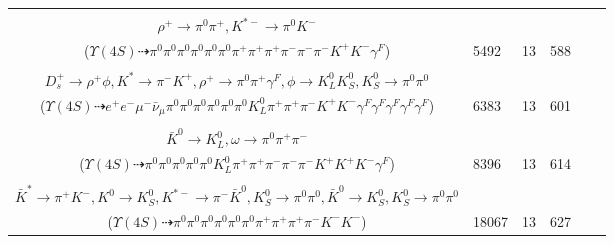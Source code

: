 \documentclass[landscape]{article}
\newcounter{rownumbers}
\newcommand\rn{\stepcounter{rownumbers}\arabic{rownumbers}}
\newcommand{\EOLP}{\\ \hline} %
\newcommand{\topoTags}[1]{#1} %
\begin{document}
\begin{longtable}{clcccc}
\rn & \makecell[l]{ $ 
\Upsilon(4S) \rightarrow B^{0} \bar{B}^{0} ,
B^{0} \rightarrow \pi^{0} \pi^{+} \rho^{-} \omega \bar{D}^{0} ,
\bar{B}^{0} \rightarrow \rho^{+} K^{*-} ,
\rho^{-} \rightarrow \pi^{0} \pi^{-} ,
\omega \rightarrow \pi^{0} \pi^{+} \pi^{-} ,
\bar{D}^{0} \rightarrow \pi^{0} \pi^{-} K^{+} \gamma^{F} ,
$ \\ $
\rho^{+} \rightarrow \pi^{0} \pi^{+} ,
K^{*-} \rightarrow \pi^{0} K^{-} 
$ \\ ($
\Upsilon(4S) \dashrightarrow \pi^{0} \pi^{0} \pi^{0} \pi^{0} \pi^{0} \pi^{0} \pi^{+} \pi^{+} \pi^{+} \pi^{-} \pi^{-} \pi^{-} K^{+} K^{-} \gamma^{F} 
$) } & \topoTags{5492 & }13 & 588 \EOLP

\rn & \makecell[l]{ $ 
\Upsilon(4S) \rightarrow B^{0} \bar{B}^{0} ,
B^{0} \rightarrow \eta \eta D^{-} D_{s}^{+} ,
\bar{B}^{0} \rightarrow \pi^{+} K^{-} \gamma^{F} \gamma^{F} ,
\eta \rightarrow \pi^{0} \pi^{0} \pi^{0} ,
\eta \rightarrow e^{+} e^{-} \gamma^{F} \gamma^{F} ,
D^{-} \rightarrow \mu^{-} \bar{\nu}_{\mu} K^{*} ,
$ \\ $
D_{s}^{+} \rightarrow \rho^{+} \phi ,
K^{*} \rightarrow \pi^{-} K^{+} ,
\rho^{+} \rightarrow \pi^{0} \pi^{+} \gamma^{F} ,
\phi \rightarrow K_{L}^{0} K_{S}^{0} ,
K_{S}^{0} \rightarrow \pi^{0} \pi^{0} 
$ \\ ($
\Upsilon(4S) \dashrightarrow e^{+} e^{-} \mu^{-} \bar{\nu}_{\mu} \pi^{0} \pi^{0} \pi^{0} \pi^{0} \pi^{0} \pi^{0} K_{L}^{0} \pi^{+} \pi^{+} \pi^{-} K^{+} K^{-} \gamma^{F} \gamma^{F} \gamma^{F} \gamma^{F} \gamma^{F} 
$) } & \topoTags{6383 & }13 & 601 \EOLP

\rn & \makecell[l]{ $ 
\Upsilon(4S) \rightarrow B^{0} \bar{B}^{0} ,
B^{0} \rightarrow \pi^{+} \rho^{-} \eta K^{+} D_{s}^{-} ,
\bar{B}^{0} \rightarrow \bar{K}^{0} K^{+} K^{-} \gamma^{F} ,
\rho^{-} \rightarrow \pi^{0} \pi^{-} ,
\eta \rightarrow \pi^{0} \pi^{0} \pi^{0} ,
D_{s}^{-} \rightarrow \pi^{-} \omega ,
$ \\ $
\bar{K}^{0} \rightarrow K_{L}^{0} ,
\omega \rightarrow \pi^{0} \pi^{+} \pi^{-} 
$ \\ ($
\Upsilon(4S) \dashrightarrow \pi^{0} \pi^{0} \pi^{0} \pi^{0} \pi^{0} K_{L}^{0} \pi^{+} \pi^{+} \pi^{-} \pi^{-} \pi^{-} K^{+} K^{+} K^{-} \gamma^{F} 
$) } & \topoTags{8396 & }13 & 614 \EOLP

\rn & \makecell[l]{ $ 
\Upsilon(4S) \rightarrow \bar{B}^{0} \bar{B}^{0} ,
\bar{B}^{0} \rightarrow \pi^{+} K^{*}(1410)^{-} ,
\bar{B}^{0} \rightarrow D^{+} D_{s}^{-} ,
K^{*}(1410)^{-} \rightarrow \pi^{0} K^{-} ,
D^{+} \rightarrow \pi^{0} \pi^{+} \bar{K}^{*} ,
D_{s}^{-} \rightarrow K^{0} K^{*-} ,
$ \\ $
\bar{K}^{*} \rightarrow \pi^{+} K^{-} ,
K^{0} \rightarrow K_{S}^{0} ,
K^{*-} \rightarrow \pi^{-} \bar{K}^{0} ,
K_{S}^{0} \rightarrow \pi^{0} \pi^{0} ,
\bar{K}^{0} \rightarrow K_{S}^{0} ,
K_{S}^{0} \rightarrow \pi^{0} \pi^{0} 
$ \\ ($
\Upsilon(4S) \dashrightarrow \pi^{0} \pi^{0} \pi^{0} \pi^{0} \pi^{0} \pi^{0} \pi^{+} \pi^{+} \pi^{+} \pi^{-} K^{-} K^{-} 
$) } & \topoTags{18067 & }13 & 627 \EOLP


\end{longtable}
\end{document}
